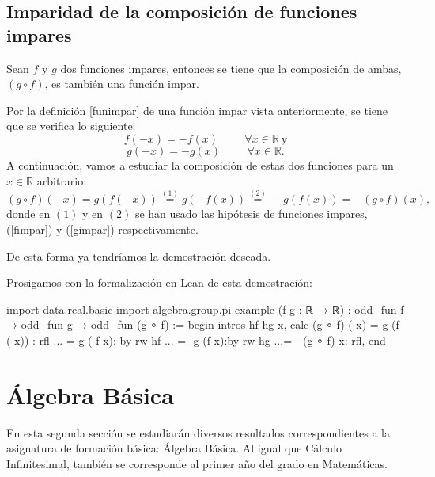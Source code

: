 \subsection{Imparidad de la composición de funciones impares}
\begin{teorema}
	Sean \(f\) y \(g\) dos funciones impares, entonces se tiene que la composición de ambas, \( (g \circ f)\), es también una función impar.
\end{teorema}
\begin{demostracion}
	Por la definición \ref{funimpar} de una función impar vista anteriormente, se tiene que se verifica lo siguiente:
	\begin{equation}\label{fimpar}
	f(-x)=-f(x)\hspace{1cm}\forall x \in \mathbb{R} \ \text{y}
	\end{equation}
	\begin{equation}\label{gimpar}
	g(-x)=-g(x)\hspace{1cm}\forall x \in \mathbb{R}.
	\end{equation}
	A continuación, vamos a estudiar la composición de estas dos funciones para un \(x \in \mathbb{R}\) arbitrario:
	\begin{equation*}
	(g \circ f)(-x)=g(f(-x))\stackrel{(1)}{=}g(-f(x))\stackrel{(2)}{=}-g(f(x))=-(g\circ f)(x),
	\end{equation*}
	donde en \((1)\) y en \((2)\) se han usado las hipótesis de funciones impares, (\ref{fimpar}) y (\ref{gimpar}) respectivamente.
	
	De esta forma ya tendríamos la demostración deseada.
\end{demostracion}

Prosigamos con la formalización en Lean de esta demostración:
\begin{leancode}
import data.real.basic
import algebra.group.pi
example (f g : ℝ → ℝ) : odd_fun f → odd_fun g →  odd_fun (g ∘ f) :=
begin
intros hf hg x,
calc (g ∘ f) (-x) = g (f (-x)) : rfl
... = g (-f x): by rw hf
... =- g (f x):by rw hg
...= - (g ∘ f) x: rfl,
end
\end{leancode}
\newpage 
\section{Álgebra Básica}
En esta segunda sección se estudiarán diversos resultados correspondientes a la asignatura de formación básica: Álgebra Básica. Al igual que Cálculo Infinitesimal, también se corresponde al primer año del grado en Matemáticas.

